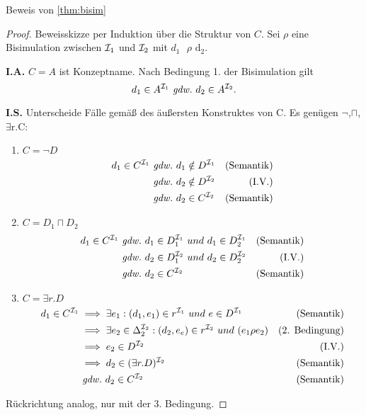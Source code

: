 \begin{tafel} Beweis von \autoref{thm:bisim}
\begin{proof}
Beweisskizze per Induktion über die Struktur von $C$. Sei $\rho$ eine
Bisimulation zwischen $\mathcal{I}_1$ und $\mathcal{I}_2$ mit
$d_1\text{\ $\rho$}\text{\ d}_2$.

\textbf{I.A.} $C = A$ ist Konzeptname. Nach Bedingung 1. der
Bisimulation gilt
\[ d_1 \in A^{\mathcal{I}_1} \ \mathit{gdw.}\  d_2 \in A^{\mathcal{I}_2}. \]


\textbf{I.S.} Unterscheide Fälle gemäß des äußersten Konstruktes von C.
Es genügen $\neg$,$\sqcap$, $\exists\text{r.C}$:

\begin{enumerate}
\item $C = \neg D$
    \begin{align*}
        d_1 \in C^{\mathcal{I}_1}
        &\ \mathit{gdw.}\  d_1 \notin D^{\mathcal{I}_1} & \text{(Semantik)}\\
        &\ \mathit{gdw.}\  d_2 \notin D^{\mathcal{I}_2} & \text{(I.V.)}\\
        &\ \mathit{gdw.}\  d_2 \in C^{\mathcal{I}_2} & \text{(Semantik)}
    \end{align*}
\item $C = D_1 \sqcap D_2$
  \begin{align*}
d_1 \in C^{\mathcal{I}_1}
&\ \mathit{gdw.}\  d_1 \in D_1^{\mathcal{I}_1}\ und\ d_1 \in D_2^{\mathcal{I}_1} & \text{(Semantik)}\\
&\ \mathit{gdw.}\  d_2 \in D_1^{\mathcal{I}_2}\ und\ d_2 \in D_2^{\mathcal{I}_2} & \text{(I.V.)}\\
&\ \mathit{gdw.}\  d_2 \in C^{\mathcal{I}_2} & \text{(Semantik)}
\end{align*}

\item $C = \exists r.D$
  \begin{align*}
d_1 \in C^{\MI_1}
&\implies \exists e_1 : (d_1,e_1) \in r^{\MI_1}\ und\ e \in D^{\MI_1} & \text{(Semantik)}\\
&\implies \exists e_2 \in \Delta_2^{\MI_2}: (d_2,e_e) \in r^{\MI_2}\ und\ (e_1 \rho e_2) & \text{(2. Bedingung)}\\
&\implies e_2 \in D^{\MI_2} & \text{(I.V.)}\\
&\implies d_2 \in (\exists r.D)^{\MI_2} & \text{(Semantik)}\\
&\gdw d_2 \in C^{\MI_2} & \text{(Semantik)}
\end{align*}
\end{enumerate}
Rückrichtung analog, nur mit der 3. Bedingung.
\end{proof}
\end{tafel}

